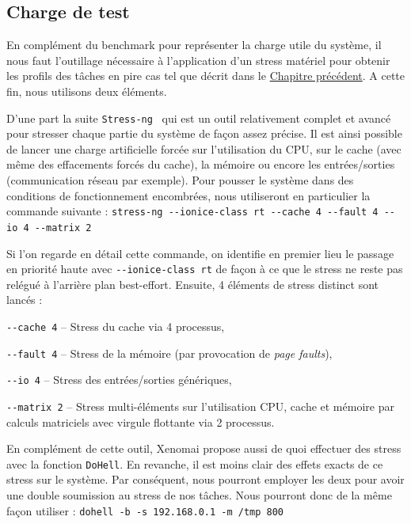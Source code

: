 \documentclass[french, a4paper, 11pt, twoside, pdftex]{StyleThese}
\begin{document}
	\subsection{Charge de test}
	En complément du benchmark pour représenter la charge utile du système, il nous faut l'outillage nécessaire à l'application d'un stress matériel pour obtenir les profils des tâches en pire cas tel que décrit dans le \hyperref[chap:4_ProtocolExpe]{Chapitre précédent}. A cette fin, nous utilisons deux éléments.
	
	D'une part la suite \texttt{Stress-ng}~\cite{king_stress-ng_2019} qui est un outil relativement complet et avancé pour stresser chaque partie du système de façon assez précise. Il est ainsi possible de lancer une charge artificielle forcée sur l'utilisation du CPU, sur le cache (avec même des effacements forcés du cache), la mémoire ou encore les entrées/sorties (communication réseau par exemple). Pour pousser le système dans des conditions de fonctionnement encombrées, nous utiliseront en particulier la commande suivante : 
	\smallbreak
	\texttt{stress-ng -{}-ionice-class rt -{}-cache 4 -{}-fault 4 -{}-io 4 -{}-matrix 2}
	\smallbreak
	
	Si l'on regarde en détail cette commande, on identifie en premier lieu le passage en priorité haute avec \texttt{-{}-ionice-class rt} de façon à ce que le stress ne reste pas relégué à l'arrière plan best-effort. Ensuite, 4 éléments de stress distinct sont lancés : 
	\begin{description}
		\item \texttt{-{}-cache 4} -- Stress du cache via 4 processus,
		\item \texttt{-{}-fault 4} -- Stress de la mémoire (par provocation de \textit{page faults}),
		\item \texttt{-{}-io 4} -- Stress des entrées/sorties génériques,
		\item \texttt{-{}-matrix 2} -- Stress multi-éléments sur l'utilisation CPU, cache et mémoire par calculs matriciels avec virgule flottante via 2 processus.
	\end{description}

	En complément de cette outil, Xenomai propose aussi de quoi effectuer des stress avec la fonction \texttt{DoHell}. En revanche, il est moins clair des effets exacts de ce stress sur le système. Par conséquent, nous pourront employer les deux pour avoir une double soumission au stress de nos tâches. Nous pourront donc de la même façon utiliser : 
	\smallbreak
	\texttt{dohell -b -s 192.168.0.1 -m /tmp 800}
	\smallbreak
	
\end{document}
